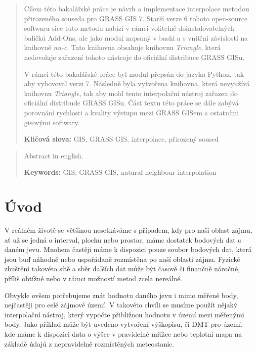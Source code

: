 \documentclass[12pt,a4paper]{article}
\author{Adam Laža}
\newcommand{\keywords}[2]{\noindent\textbf{#1: }#2}
\newcommand{\necislovana}[1]{%
\phantomsection
\addcontentsline{toc}{section}{#1}
\section*{#1}
\markboth{\uppercase{#1}}{}
}
\begin{document}
\pagestyle{empty}

\newpage


\newpage
\begin{abstract}
\bigskip
Cílem této bakalářské práce je návrh a implementace interpolace metodou přirozeného souseda pro GRASS GIS 7. Starší verze 6 tohoto open-source softwaru sice tuto metodu nabízí v rámci volitelně doinstalovatelných balíčků Add-Ons, ale jako modul napsaný v bashi a s vnitřní závislostí na knihovně \textit{nn-c}. Tato knihovna obsahuje knihovnu \textit{Triangle}, která nedovoluje zařazení tohoto nástroje do oficiální distribuce GRASS GISu.

V rámci této bakalářské práce byl modul přepsán do jazyka Python, tak aby vyhovoval verzi 7. Následně byla vytvořena knihovna, která nevyužívá knihovnu \textit{Triangle}, tak aby mohl tento interpolační nástroj zařazen do oficiální distribude GRASS GISu.
Část textu této práce se dále zabývá porovnání rychlosti a kvality výstupu mezi GRASS GISem a ostatními gisovými softwary.

\bigskip
\keywords{Kličová slova}{GIS, GRASS GIS, interpolace, přirozený soused}

\end{abstract}

\begin{abstract}
\bigskip
Abstract in english.

\bigskip
\keywords{Keywords}{GIS, GRASS GIS, natural neighbour interpolation}

\end{abstract}

\newpage
\tableofcontents

\newpage
\pagestyle{fancy}

\necislovana{Úvod}
V reálném životě se většinou nesetkáváme s případem, kdy pro naši oblast zájmu, ať už se jedná o interval, plochu nebo prostor, máme dostatek bodových dat o daném jevu. Mnohem častěji máme k dispozici pouze soubor bodových dat, která jsou buď náhodně nebo uspořádaně rozmístěna po naší oblasti zájmu. Fyzické zhuštění takovéto sítě a sběr dalších dat může být časově či finančně náročné, příliš obtížné nebo v rámci možností metod zcela nereálné.

Obvykle ovšem potřebujeme znát hodnotu daného jevu i mimo měřené body, nejčastěji pro celé zájmové území. V takovéto chvíli se musíme použít nějaký interpolační nástroj, který vypočte přibližnou hodnotu v území mezi měřenými body. Jako příklad může být uvedeno vytvoření výškopisu, či DMT pro území, kde máme k dispozici data o výšce v pravidelné mřížce nebo teplotní mapa na základě údajů z nepravidelně rozmístěných meteostanic.
\end{document}
